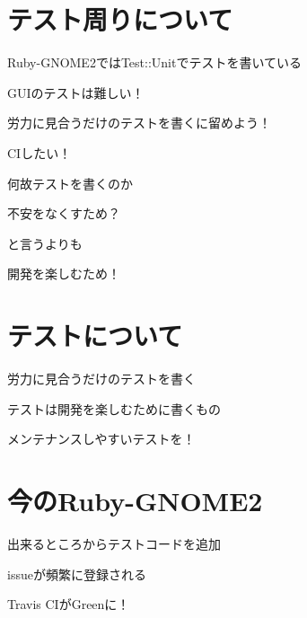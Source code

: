 \section{テスト周りについて}
\begin{frame}
\begin{itemize}
{\huge
\item{} Ruby-GNOME2ではTest::Unitでテストを書いている
\item{} GUIのテストは難しい！
\item{} 労力に見合うだけのテストを書くに留めよう！
\item{} CIしたい！
}
\end{itemize}
\end{frame}

\begin{frame}
\begin{center}
{\Huge
\item 何故テストを書くのか
}
\end{center}
\end{frame}

\begin{frame}
\begin{center}
{\Huge
\item 不安をなくすため？
}
\end{center}
\end{frame}

\begin{frame}
\begin{center}
{\Huge
\item と言うよりも
}
\end{center}
\end{frame}

\begin{frame}
\begin{center}
{\Huge
開発を楽しむため！
}
\end{center}
\end{frame}

\section{テストについて}

\begin{frame}
\begin{itemize}
{\huge
\item{} 労力に見合うだけのテストを書く
\item{} テストは開発を楽しむために書くもの
\item{} メンテナンスしやすいテストを！
}
\end{itemize}
\end{frame}

\section{今のRuby-GNOME2}
\begin{frame}
\begin{itemize}
{\huge
\item 出来るところからテストコードを追加
\item issueが頻繁に登録される
\item Travis CIがGreenに！
}
\end{itemize}
\end{frame}
